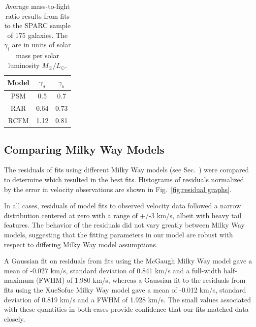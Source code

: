 \documentclass[reprint,%
 amsmath,amssymb,
 aps,
]{revtex4-1}
\begin{document}
    \begin{table}[h!]
        \centering
        \begin{tabular}{|c|c|c|}
        \hline
        Model & $\gamma_d$ & $\gamma_b$ \\
        \hline
            PSM & 0.5 &0.7 \\
            \hline
            RAR	 &    0.64 &	0.73   \\
         \hline
           RCFM   &  1.12 &	0.81\\
           \hline
        \end{tabular}
        \caption{Average mass-to-light ratio results from fits to the SPARC sample of 175 galaxies. The $\gamma_i$ are in units of  solar mass per solar luminosity $M_\odot/L_\odot$. }
        \label{tab:lobes}
    \end{table}
    
    
   \subsection{Comparing Milky Way Models} 
   
   
    The residuals of fits using different Milky Way models (see Sec.~) were compared to determine which resulted in the best fits.  Histograms of residuals normalized by the error in velocity observations are shown in Fig.~\ref{fig:residual graphs}. 
    
    In all cases, residuals of model fits to observed velocity data followed a narrow distribution centered at zero with a range of +/-3 km/s, albeit with heavy tail features. The behavior of the residuals did not vary greatly between Milky Way models, suggesting that the fitting parameters in our model are robust with respect to differing Milky Way model assumptions. 
    
    A Gaussian fit on residuals from fits using the McGaugh Milky Way model gave a mean of -0.027 km/s, standard deviation of 0.841 km/s and a full-width half-maximum (FWHM) of 1.980 km/s, whereas a Gaussian fit to the residuals from fits using the XueSofue Milky Way model gave a mean of -0.012 km/s, standard deviation of 0.819 km/s and a FWHM of  1.928 km/s. The small values associated with these quantities in both cases provide confidence that our fits matched data closely.
    
\end{document}
